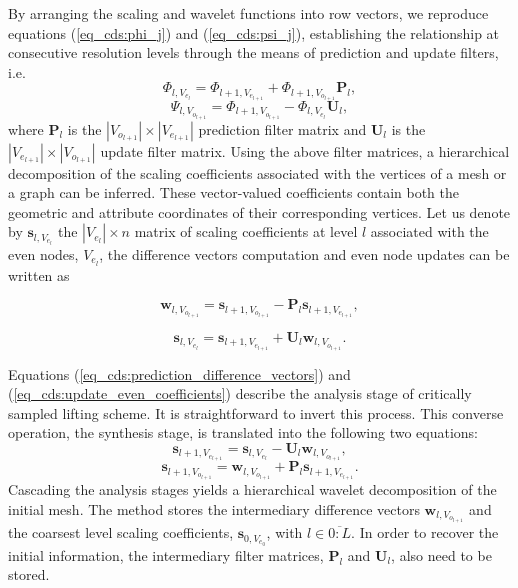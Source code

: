 \documentclass[graybox]{svmult}
\begin{document}
	
	By arranging the scaling and wavelet functions into row vectors, we reproduce equations (\ref{eq_cds:phi_j}) and (\ref{eq_cds:psi_j}), establishing the relationship at consecutive resolution levels through the means of prediction and update filters, i.e.
	\begin{equation}
	\Phi_{l,V_{e_l}} = \Phi_{l+1,V_{e_{l+1}}} +  \Phi_{l+1, V_{o_{l+1}}} \mathbf{P}_l,
	\label{eq_cds:prediction_functions}
	\end{equation}
	\begin{equation}
	\Psi_{l,V_{o_{l+1}}} = \Phi_{l+1,V_{o_{l+1}}} - \Phi_{l,V_{e_l}}  \mathbf{U}_l,
	\label{eq_cds:update_functions}
	\end{equation}
	where $\mathbf{P}_l$ is the $|V_{o_{l+1}}| \times |V_{e_{l+1}}|$ prediction filter matrix and $\mathbf{U}_l$ is the  $|V_{e_{l+1}}| \times |V_{o_{l+1}}|$ update filter matrix.
	Using the above filter matrices, a hierarchical decomposition of the scaling coefficients associated with the vertices of a mesh or a graph can be inferred. These vector-valued coefficients contain both the geometric and attribute coordinates of their corresponding vertices. Let us denote by $\mathbf{s}_{l,V_{e_l}}$ the $|V_{e_l}| \times n$ matrix of scaling coefficients at level $l$ associated with the even nodes, $V_{e_l}$, the difference vectors computation and even node updates can be written as
	
	\begin{equation}
	\mathbf{w}_{l,V_{o_{l+1}}} = \mathbf{s}_{l+1,V_{o_{l+1}}} - \mathbf{P}_l \mathbf{s}_{l+1,V_{e_{l+1}}},
	\label{eq_cds:prediction_difference_vectors} 
	\end{equation}
	
	\begin{equation}
	\mathbf{s}_{l,V_{e_l}} = \mathbf{s}_{l+1,V_{e_{l+1}}} + \mathbf{U}_l \mathbf{w}_{l,V_{o_{l+1}}}.
	\label{eq_cds:update_even_coefficients}
	\end{equation}
	
	Equations (\ref{eq_cds:prediction_difference_vectors}) and (\ref{eq_cds:update_even_coefficients}) describe the analysis stage of critically sampled lifting scheme. It is straightforward
	to invert this process. This converse operation, the synthesis stage, is translated into the following two equations:
	\begin{equation}
	\mathbf{s}_{l+1,V_{e_{l+1}}} = \mathbf{s}_{l,V_{e_l}} - \mathbf{U}_l \mathbf{w}_{l,V_{o_{l+1}}},
	\label{eq_cds:synthesis_odd}
	\end{equation}
	\begin{equation}
	\mathbf{s}_{l+1,V_{o_{l+1}}} = \mathbf{w}_{l,V_{o_{l+1}}} + \mathbf{P}_l \mathbf{s}_{l+1,V_{e_{l+1}}}.
	\label{eq_cds:synthesis_even}
	\end{equation}
	Cascading the analysis stages yields a hierarchical wavelet decomposition of the initial mesh. The method stores the intermediary difference vectors $\mathbf{w}_{l,V_{o_{l+1}}}$ and the 
	coarsest level scaling coefficients, $\mathbf{s}_{0, V_{e_0}}$, with $l \in \overline{0:L}$. In order to recover the initial information, the intermediary filter matrices, $\mathbf{P}_l$ and
	$\mathbf{U}_l$, also need to be stored.
	
\end{document}
